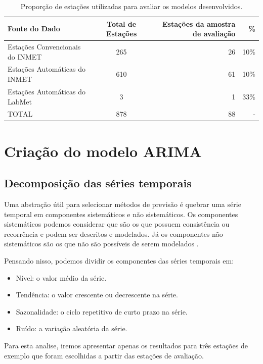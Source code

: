 \begin{table}[H]
\caption{Proporção de estações utilizadas para avaliar os modelos desenvolvidos.}
\label{tab:amostra_estacoes}
\begin{adjustbox}{width=\textwidth}
\begin{tabular}{|l|c|r|r|}
\hline
\textbf{Fonte do Dado} & \textbf{Total de Estações} & \textbf{Estações da amostra de avaliação} & \% \\
\hline
Estações Convencionais do INMET  & 265 & 26 & 10\% \\
\hline
Estações Automáticas do INMET & 610 & 61 & 10\% \\
\hline
Estações Automáticas do LabMet & 3 & 1 & 33\% \\
\hline
TOTAL & 878 & 88 & - \\
\hline
\end{tabular}
\end{adjustbox}
\end{table}

\section{Criação do modelo ARIMA}

\subsection{Decomposição das séries temporais}

Uma abstração útil para selecionar métodos de previsão é quebrar uma série temporal em componentes sistemáticos e não sistemáticos. Os componentes sistemáticos podemos considerar que são os que possuem consistência ou recorrência e podem ser descritos e modelados. Já os componentes não sistemáticos são os que não são possíveis de serem modelados \cite{box2011time}.

Pensando nisso, podemos dividir os componentes das séries temporais em:
\begin{itemize}
  \item Nível: o valor médio da série.
  \item Tendência: o valor crescente ou decrescente na série.
  \item Sazonalidade: o ciclo repetitivo de curto prazo na série.
  \item Ruído: a variação aleatória da série.
\end{itemize}

Para esta analise, iremos apresentar apenas os resultados para três estações de exemplo que foram escolhidas a partir das estações de avaliação.

